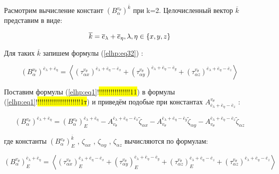 Расмотрим вычисление констант 
$ \left( B_{\alpha}^{ v_{\theta}} \right)^{ \overline{k}} $
при k=2. Целочисленный вектор 
$ \overline{k}$
представим в виде:

\begin{equation}
    \label{elhp:eq47}
    \overline{k} = \overline{e}_{\lambda} + \overline{e}_{\eta}, \\ \lambda,\eta \in \{x,y,z\}  
\end{equation}

Для таких 
$ \overline{k}$
запишем формулы 
(\ref{elhp:eq32})
:

\begin{equation}
    \label{elhp:eq48}
    \left( B_{\alpha}^{\nu_{\theta}} \right)^{ \overline{e}_{\lambda} + \overline{e}_{\eta}  } 
    =
    \left< 
    \left( \tau_{\alpha x}^{v_{\theta}} \right)^{\overline{e}_{\lambda} + \overline{e}_{\eta} - \overline{e}_x } 
    +
    \left( \tau_{\alpha y}^{v_{\theta}} \right)^{\overline{e}_{\lambda} + \overline{e}_{\eta} - \overline{e}_y } 
    +
    \left( \tau_{\alpha z}^{v_{\theta}} \right)^{\overline{e}_{\lambda} + \overline{e}_{\eta} - \overline{e}_z } 
    \right> 
\end{equation}

Поставим формулы 
(\ref{elhp:eq1}!\colorbox{yellow}{!!!!!!!!!!!!!!!!11})
в формулы 
(\ref{elhp:eq1}!\colorbox{yellow}{!!!!!!!!!!!!!!!!!!!!!!1т})
и приведём подобые при константах 
${A}_{ \overline{e}_{\lambda} + \overline{e}_{\eta} - \overline{e}_z}^{ v_{\theta}} $
:

\begin{equation}
    \label{elhp:eq49}
    \left( B_{\alpha}^{v_{\theta}} \right)^{ \overline{e}_{\lambda} + \overline{e}_{\eta}  } 
    =
    \left( B_{\alpha}^{v_{\theta}} \right)^{ \overline{e}_{\lambda} + \overline{e}_{\eta}  }_E
    -
    A_{v_{\theta}}^{\overline{e}_{\lambda} + \overline{e}_{\eta} - \overline{e}_x }
    \widetilde{\zeta}_{\alpha x}
    -
    A_{v_{\theta}}^{\overline{e}_{\lambda} + \overline{e}_{\eta} - \overline{e}_y }
    \widetilde{\zeta}_{\alpha y}
    -
    A_{v_{\theta}}^{\overline{e}_{\lambda} + \overline{e}_{\eta} - \overline{e}_z }
    \widetilde{\zeta}_{\alpha z}
\end{equation}

где константы 
$ \left( B_{\alpha}^{ v_{\theta}} \right)_E^{ \overline{k}} $
, 
${\zeta}_{\alpha x}$ 
, 
${\zeta}_{\alpha y}$ 
,
${\zeta}_{\alpha z}$ 
вычисляются по формулам:

\begin{equation}
    \label{elhp:eq50}
    \left( B_{\alpha}^{v_{\theta}} \right)^{ \overline{e}_{\lambda} + \overline{e}_{\eta}  }_E
    =
    \left< 
    \left( \tau_{\alpha x}^{v_{\theta}} \right)_E^{\overline{e}_{\lambda} + \overline{e}_{\eta} - \overline{e}_x } 
    +
    \left( \tau_{\alpha y}^{v_{\theta}} \right)_E^{\overline{e}_{\lambda} + \overline{e}_{\eta} - \overline{e}_y } 
    +
    \left( \tau_{\alpha z}^{v_{\theta}} \right)_E^{\overline{e}_{\lambda} + \overline{e}_{\eta} - \overline{e}_z } 
    +
    \left( \tau_{\alpha z}^{v_{\theta}} \right)^{\overline{e}_{\lambda} + \overline{e}_{\eta} - \overline{e}_z } 
    \right> 
\end{equation}

